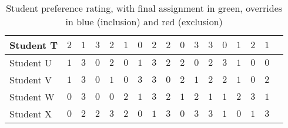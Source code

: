 \documentclass[11pt]{article}
\begin{document}
\begin{center}
\begin{table}[h]
\begin{tabular}{|a|l|l|l|l|l|l|l|l|l|l|l|l|l|c|l|l|}
Student T & $2$ & $1$ & $3$ & $2$ & $1$ & $0$
& $2$ & $2$ & $0$ & $3$ & $3$ & $0$ & $1$
& $2$ & $1$ \\ \hline
Student U & $1$ & $3$ & $0$ & $2$ & $0$ & $1$
& $3$ & $2$ & $2$ & $0$ & $2$ & $3$ & $1$
& $0$ & $0$ \\ \hline
Student V & $1$ & $3$ & $0$ & $1$ & $0$ & $3$
& $3$ & $0$ & $2$ & $1$ & $2$ & $2$ & $1$
& $0$ & $2$ \\ \hline
Student W & $0$ & $3$ & $0$ & $0$ & $2$ & $1$
& $3$ & $2$ & $1$ & $2$ & $1$ & $1$ & $2$
& $3$ & $1$ \\ \hline
Student X & $0$ & $2$ & $2$ & $3$ & $2$ & $0$
& $1$ & $3$ & $0$ & $3$ & $3$ & $1$ & $0$
& $1$ & $3$ \\ \hline
\end{tabular}
\caption{Student preference rating, with final assignment in green, overrides in blue (inclusion) and red (exclusion)}
\label{table:pref}
\end{table}
\end{center}

\FloatBarrier
\end{document}
